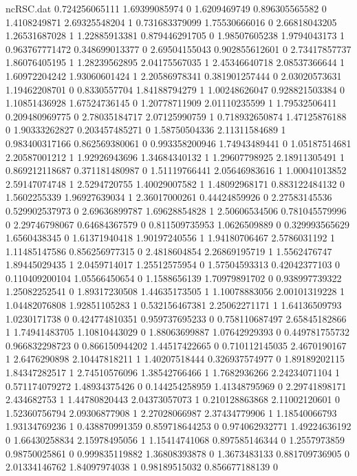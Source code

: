 \begin{filecontents}{ncRSC.dat}
0.724256065111 1.69399085974 0
1.6209469749 0.896305565582 0
1.4108249871 2.69325548204 1
0.731683379099 1.75530666016 0
2.66818043205 1.26531687028 1
1.22885913381 0.879446291705 0
1.98507605238 1.9794043173 1
0.963767771472 0.348699013377 0
2.69504155043 0.902855612601 0
2.73417857737 1.86076405195 1
1.28239562895 2.04175567035 1
2.45346640718 2.08537366644 1
1.60972204242 1.93060601424 1
2.20586978341 0.381901257444 0
2.03020573631 1.19462208701 0
0.8330557704 1.84188794279 1
1.00248626047 0.928821503384 0
1.10851436928 1.67524736145 0
1.20778711909 2.01110235599 1
1.79532506411 0.209480969775 0
2.78035184717 2.07125990759 1
0.718932650874 1.47125876188 0
1.90333262827 0.203457485271 0
1.58750504336 2.11311584689 1
0.983400317166 0.862569380061 0
0.993358200946 1.74943489441 0
1.05187514681 2.20587001212 1
1.92926943696 1.34684340132 1
1.29607798925 2.18911305491 1
0.869212118687 0.371181480987 0
1.51119766441 2.05646983616 1
1.00041013852 2.59147074748 1
2.5294720755 1.40029007582 1
1.48092968171 0.883122484132 0
1.5602255339 1.96927639034 1
2.36017000261 0.44424859926 0
2.27583145536 0.529902537973 0
2.69636899787 1.69628854828 1
2.50606534506 0.781045579996 0
2.29746798067 0.64684367579 0
0.811509735953 1.0626509889 0
0.329993565629 1.6560438345 0
1.61371940418 1.90197240556 1
1.94180706467 2.5786031192 1
1.11485147586 0.856256977315 0
2.4818604854 2.26869195719 1
1.5562476747 1.89445029435 1
2.0459714017 1.25512575954 0
1.57504593313 0.42042377103 0
0.110409200104 1.05566450654 0
1.1588656139 1.70979891702 0
0.938997739322 1.25082252541 0
1.89317230508 1.44635173505 1
1.10078883056 2.00101319228 1
1.04482076808 1.92851105283 1
0.532156467381 2.25062271171 1
1.64136509793 1.0230171738 0
0.424774810351 0.959737695233 0
0.758110687497 2.65845182866 1
1.74941483705 1.10810443029 0
1.88063699887 1.07642929393 0
0.449781755732 0.966832298723 0
0.866150944202 1.44517422665 0
0.710112145035 2.4670190167 1
2.6476290898 2.10447818211 1
1.40207518444 0.326937574977 0
1.89189202115 1.84347282517 1
2.74510576096 1.38542766466 1
1.7682936266 2.24234071104 1
0.571174079272 1.48934375426 0
0.144254258959 1.41348795969 0
2.29741898171 2.434682753 1
1.44780820443 2.04373057073 1
0.210128863868 2.11002120601 0
1.52360756794 2.09306877908 1
2.27028066987 2.37434779906 1
1.18540066793 1.93134769236 1
0.438870991359 0.859718644253 0
0.974062932771 1.49224636192 0
1.66430258834 2.15978495056 1
1.15414741068 0.897585146344 0
1.2557973859 0.98750025861 0
0.999835119882 1.36808393878 0
1.3673483133 0.881709736905 0
2.01334146762 1.84097974038 1
0.98189515032 0.856677188139 0

\end{filecontents}
